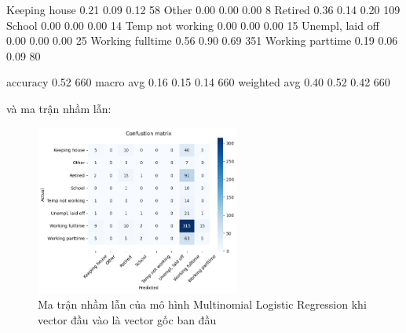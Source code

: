 \begin{enumerate}[label=(\alph*)]
\begin{python}
   Keeping house       0.21      0.09      0.12        58
           Other       0.00      0.00      0.00         8
         Retired       0.36      0.14      0.20       109
          School       0.00      0.00      0.00        14
Temp not working       0.00      0.00      0.00        15
Unempl, laid off       0.00      0.00      0.00        25
Working fulltime       0.56      0.90      0.69       351
Working parttime       0.19      0.06      0.09        80

        accuracy                           0.52       660
       macro avg       0.16      0.15      0.14       660
    weighted avg       0.40      0.52      0.42       660
    \end{python}

    và ma trận nhầm lẫn:

    \begin{figure}[H]
        \centering
        \includegraphics[width=0.6\textwidth]{figures/Thanh/Models/Logistic/Non_null_models_confusion_matrix_Logistic_original_features.png}
        \caption{Ma trận nhầm lẫn của mô hình Multinomial Logistic Regression khi vector đầu vào là vector gốc ban đầu}
        \label{fig:Non_null_models_confusion_matrix_Logistic_original_features}
    \end{figure}


\end{enumerate}
